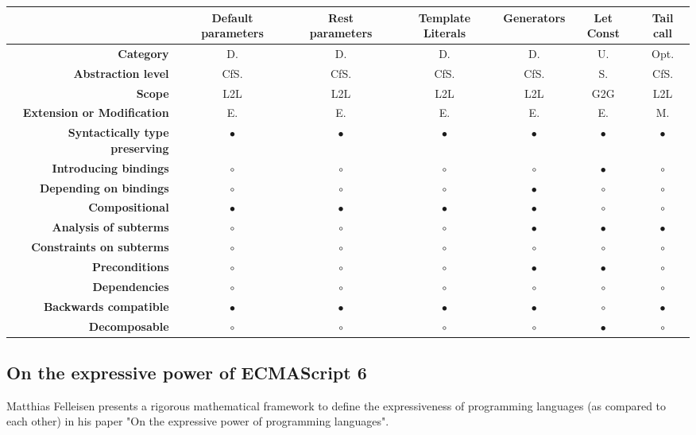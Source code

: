 {\begin{landscape}
\begin{table}[h]
\begin{tabular}{rcccccc}
\hline
& {\bf Default parameters} & {\bf Rest parameters} & {\bf Template Literals} & {\bf Generators} & {\bf Let Const} & {\bf Tail call} \\ \hline
{\bf Category} & D. & D. & D. & D. & U. & Opt. \\
{\bf Abstraction level} & CfS. & CfS. & CfS. & CfS. & S. & CfS. \\
{\bf Scope} & L2L & L2L & L2L & L2L & G2G & L2L \\
{\bf Extension or Modification} & E. & E. & E. & E. & E. & M. \\
{\bf Syntactically type preserving} & $\bullet$ & $\bullet$ & $\bullet$ & $\bullet$ & $\bullet$  & $\bullet$      \\
{\bf Introducing bindings} & $\circ$ & $\circ$ & $\circ$ & $\circ$ & $\bullet$ & $\circ$ \\
{\bf Depending on bindings} & $\circ$ & $\circ$ & $\circ$ & $\bullet$ & $\circ$ & $\circ$ \\
{\bf Compositional} & $\bullet$ & $\bullet$ & $\bullet$ & $\bullet$ & $\circ$ & $\circ$ \\
{\bf Analysis of subterms} & $\circ$ & $\circ$ & $\circ$ & $\bullet$ & $\bullet$ & $\bullet$ \\
{\bf Constraints on subterms} & $\circ$ & $\circ$ & $\circ$ & $\circ$ & $\circ$ & $\circ$ \\
{\bf Preconditions} & $\circ$ & $\circ$ & $\circ$ & $\bullet$ & $\bullet$ & $\circ$ \\
{\bf Dependencies} & $\circ$ & $\circ$ & $\circ$ & $\circ$ & $\circ$ & $\circ$ \\
{\bf Backwards compatible} & $\bullet$ & $\bullet$ & $\bullet$ & $\bullet$ & $\circ$ & $\bullet$ \\
{\bf Decomposable} & $\circ$ & $\circ$ & $\circ$ & $\circ$ & $\bullet$ & $\circ$ \\ \hline
\end{tabular}
	\end{table}

		
	\end{landscape}
	\clearpage
}

\subsection{On the expressive power of ECMAScript 6}
Matthias Felleisen presents a rigorous mathematical framework to define the expressiveness of programming languages (as compared to each other) in his paper "On the expressive power of programming languages"\cite{Felleisen1990}. 

